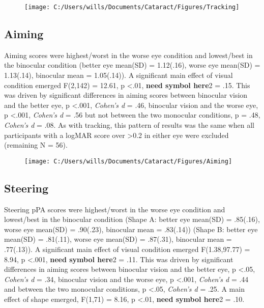 \documentclass[
  english,
  man,floatsintext]{apa6}
\begin{document}
\begin{figure}

{\centering \texttt{[image: C:/Users/wills/Documents/Cataract/Figures/Tracking]} 

}

\caption{ }\label{fig:unnamed-chunk-1}
\end{figure}

\hypertarget{aiming}{%
\subsection{Aiming}\label{aiming}}

Aiming scores were highest/worst in the worse eye condition and lowest/best in the binocular condition (better eye mean(SD) = 1.12(.16), worse eye mean(SD) = 1.13(.14), binocular mean = 1.05(.14)).
A significant main effect of visual condition emerged F(2,142) = 12.61, p \textless{}.01, \textbf{need symbol here}2 = .15.
This was driven by significant differences in aiming scores between binocular vision and the better eye, p \textless{}.001, \emph{Cohen's d} = .46, binocular vision and the worse eye, p \textless{}.001, \emph{Cohen's d} = .56 but not between the two monocular conditions, p = .48, \emph{Cohen's d} = .08.
As with tracking, this pattern of results was the same when all participants with a logMAR score over \textgreater{}0.2 in either eye were excluded (remaining N = 56).

\begin{figure}

{\centering \texttt{[image: C:/Users/wills/Documents/Cataract/Figures/Aiming]} 

}

\caption{ }\label{fig:unnamed-chunk-2}
\end{figure}

\hypertarget{steering}{%
\subsection{Steering}\label{steering}}

Steering pPA scores were highest/worst in the worse eye condition and lowest/best in the binocular condition (Shape A: better eye mean(SD) = .85(.16), worse eye mean(SD) = .90(.23), binocular mean = .83(.14)) (Shape B: better eye mean(SD) = .81(.11), worse eye mean(SD) = .87(.31), binocular mean = .77(.13)).
A significant main effect of visual condition emerged F(1.38,97.77) = 8.94, p \textless{}.001, \textbf{need symbol here}2 = .11.
This was driven by significant differences in aiming scores between binocular vision and the better eye, p \textless{}.05, \emph{Cohen's d} = .34, binocular vision and the worse eye, p \textless{}.001, \emph{Cohen's d} = .44 and between the two monocular conditions, p \textless{}.05, \emph{Cohen's d} = .25.
A main effect of shape emerged, F(1,71) = 8.16, p \textless{}.01, \textbf{need symbol here}2 = .10.
\end{document}
